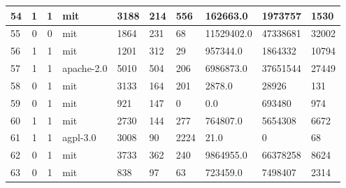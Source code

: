 \begin{landscape}
\begin{table}[]
{\begin{tabular}{lcclllllll}
                54 & 1                          & 1                     & mit              & 3188             & 214                   & 556                          & 162663.0        & 1973757            & 1530                \\ \hline
                55 & 0                          & 0                     & mit              & 1864             & 231                   & 68                           & 11529402.0      & 47338681           & 32002               \\ \hline
                56 & 1                          & 1                     & mit              & 1201             & 312                   & 29                           & 957344.0        & 1864332            & 10794               \\ \hline
                57 & 1                          & 1                     & apache-2.0       & 5010             & 504                   & 206                          & 6986873.0       & 37651544           & 27449               \\ \hline
                58 & 0                          & 1                     & mit              & 3133             & 164                   & 201                          & 2878.0          & 28926              & 131                 \\ \hline
                59 & 0                          & 1                     & mit              & 921              & 147                   & 0                            & 0.0             & 693480             & 974                 \\ \hline
                60 & 1                          & 1                     & mit              & 2730             & 144                   & 277                          & 764807.0        & 5654308            & 6672                \\ \hline
                61 & 1                          & 1                     & agpl-3.0         & 3008             & 90                    & 2224                         & 21.0            & 0                  & 68                  \\ \hline
                62 & 0                          & 1                     & mit              & 3733             & 362                   & 240                          & 9864955.0       & 66378258           & 8624                \\ \hline
                63 & 0                          & 1                     & mit              & 838              & 97                    & 63                           & 723459.0        & 7498407            & 2314                \\ \hline

\end{tabular}}
\end{table}
\end{landscape}
